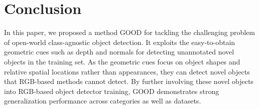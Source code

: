 \documentclass{article} \usepackage{iclr2023_conference,times}
\begin{document}
\begin{table}
\centering
\caption{\textbf{Base class choices for studying the influence of the number of base classes.}}
\label{tab:base_class}
\end{table}

 \section{Conclusion}
In this paper, we proposed a method GOOD for tackling the challenging problem of open-world class-agnostic object detection. It exploits the easy-to-obtain geometric cues such as depth and normals for detecting unannotated novel objects in the training set. As the geometric cues focus on object shapes and relative spatial locations rather than appearances, they can detect novel objects that RGB-based methods cannot detect. By further involving these novel objects into RGB-based object detector training, GOOD demonstrates strong generalization performance across categories as well as datasets. 
\end{document}
